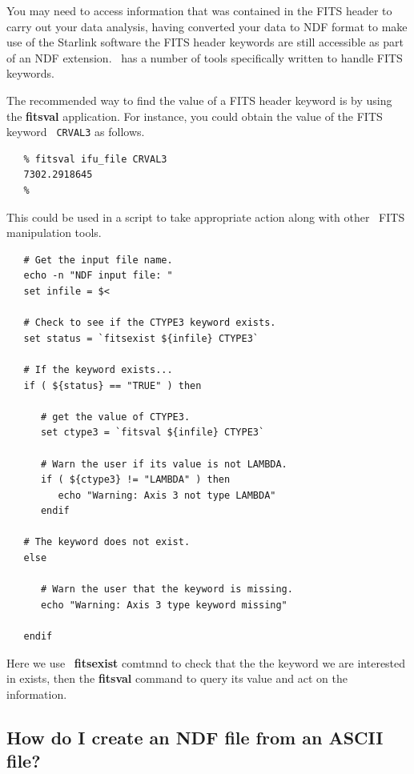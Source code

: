 \documentclass[twoside,11pt]{article}
\newcommand{\htmlref}[2]{#1}
\newcommand{\xref}[3]{#1}
\newcommand{\xlabel}[1]{}
\begin{document}
{You may need to access information that was contained in the FITS
header to carry out your data analysis, having converted your data to
\xref{NDF}{sun33}{} format to make use of the Starlink software the
FITS header keywords are still accessible as part of an NDF extension.
\KAPPAref\ has a number of tools specifically written to handle
\xref{FITS keywords}{sun95}{se_fitsairlock}.

The recommended way to find the value of a FITS header keyword is by
using the \xref{{\bf fitsval}}{sun95}{FITSVAL} application.  For instance, you
could obtain the value of the FITS keyword \htmlref{{\tt
CRVAL3}}{sc16_teifufile} as follows.

\small\begin{verbatim}
   % fitsval ifu_file CRVAL3
   7302.2918645
   %
\end{verbatim}\normalsize

This could be used in a script to take appropriate action along with
other \KAPPA\ \xref{FITS manipulation tools}{sun95}{se_fitsairlock}.

\small\begin{verbatim}
   # Get the input file name.
   echo -n "NDF input file: "
   set infile = $<
   
   # Check to see if the CTYPE3 keyword exists.
   set status = `fitsexist ${infile} CTYPE3`
   
   # If the keyword exists...
   if ( ${status} == "TRUE" ) then
   
      # get the value of CTYPE3.
      set ctype3 = `fitsval ${infile} CTYPE3`

      # Warn the user if its value is not LAMBDA.
      if ( ${ctype3} != "LAMBDA" ) then
         echo "Warning: Axis 3 not type LAMBDA"
      endif
      
   # The keyword does not exist.
   else
   
      # Warn the user that the keyword is missing.
      echo "Warning: Axis 3 type keyword missing"
      
   endif
\end{verbatim}\normalsize

Here we use \KAPPA\ \xref{{\bf fitsexist}}{sun95}{FITSEXIST} comtmnd to check
that the the keyword we are interested in exists, then the
{\bf fitsval} command to query its value and act on
the information.

\subsection{\xlabel{sc16_newndf}How do I create an NDF file from an ASCII file?\label{sc16_newndf}}

}
\end{document}
